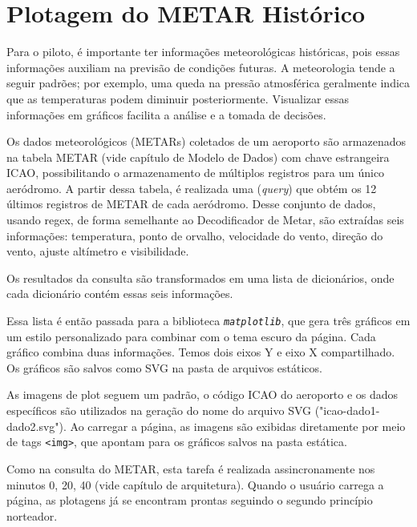 \chapter{Plotagem do METAR Histórico}

Para o piloto, é importante ter informações meteorológicas históricas, pois 
essas informações auxiliam na previsão de condições futuras. A meteorologia tende 
a seguir padrões; por exemplo, uma queda na pressão atmosférica geralmente indica 
que as temperaturas podem diminuir posteriormente. Visualizar essas 
informações em gráficos facilita a análise e a tomada de decisões.

Os dados meteorológicos (METARs) coletados de um aeroporto são armazenados na tabela
METAR (vide capítulo de Modelo de Dados) com chave estrangeira ICAO, possibilitando
o armazenamento de múltiplos registros para um único aeródromo. A partir dessa 
tabela, é realizada uma (\textit{query}) que obtém os 12 últimos registros 
de METAR de cada aeródromo. Desse conjunto de dados, usando regex, de forma
semelhante ao Decodificador de Metar, são extraídas seis informações: 
temperatura, ponto de orvalho, velocidade do vento, direção do vento, ajuste altímetro e visibilidade.

Os resultados da consulta são transformados em uma lista de dicionários, onde 
cada dicionário contém essas seis informações.




Essa lista é então passada para a biblioteca \texttt{\textit{matplotlib}}, que gera três 
gráficos em um estilo personalizado para combinar com o tema escuro da página. 
Cada gráfico combina duas informações. Temos dois eixos Y e eixo X compartilhado.
Os gráficos são salvos como SVG na pasta de arquivos estáticos.

As imagens de plot seguem um padrão, o código ICAO do aeroporto e os dados 
específicos são utilizados na geração do nome do arquivo SVG ("icao-dado1-dado2.svg"). 
Ao carregar a página, as imagens são exibidas diretamente por meio de tags \texttt{<img>},
 que apontam para os gráficos salvos na pasta estática.

Como na consulta do METAR, esta tarefa é realizada assincronamente nos 
minutos 0, 20, 40 (vide capítulo de arquitetura). Quando o usuário carrega a 
página, as plotagens já se encontram prontas seguindo o segundo princípio norteador.

